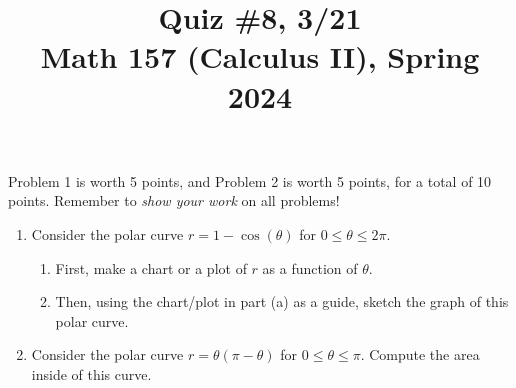 \documentclass[11pt]{article}
\title{Quiz \#8, 3/21\\ Math 157 (Calculus II), Spring 2024}
\date{}
\begin{document}
\maketitle

\thispagestyle{empty}

\vspace{-2cm}

Problem 1 is worth 5 points, and Problem 2 is worth 5 points, for a total of 10 points. Remember to \emph{show your work} on all problems!

\begin{enumerate}
\item Consider the polar curve $r=1-\cos(\theta)$ for $0 \leq \theta \leq 2\pi$.
\begin{enumerate}
\item First, make a chart or a plot of $r$ as a function of $\theta$.
\item Then, using the chart/plot in part (a) as a guide, sketch the graph of this polar curve.
\end{enumerate}

\vspace{3.25in}

\item Consider the polar curve $r=\theta(\pi-\theta)$ for $0 \leq \theta \leq \pi$. Compute the area inside of this curve.

\end{enumerate}
\end{document}
